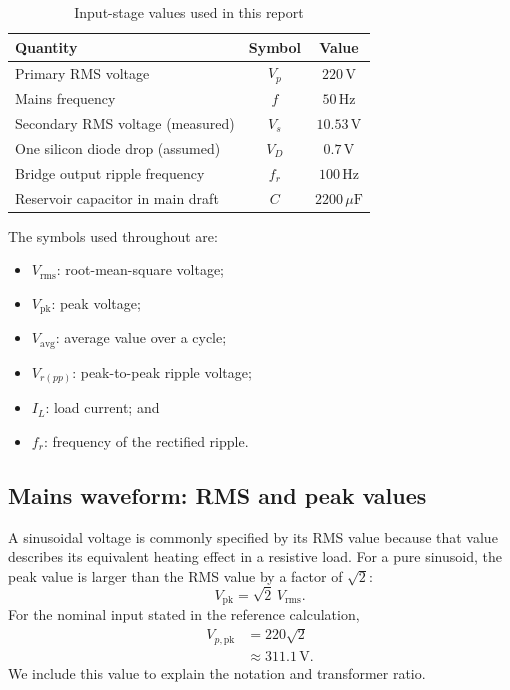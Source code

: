 \documentclass[journal,12pt,twocolumn]{IEEEtran}
\begin{document}
\begin{table}[!t]
\centering
\caption{Input-stage values used in this report}
\label{tab:input-values}
\small
\begin{tabular}{|p{}|c|c|}
\hline
\textbf{Quantity} & \textbf{Symbol} & \textbf{Value}\\ \hline
Primary RMS voltage & $V_p$ & $220\,\mathrm{V}$\\ \hline
Mains frequency & $f$ & $50\,\mathrm{Hz}$\\ \hline
Secondary RMS voltage (measured) & $V_s$ & $10.53\,\mathrm{V}$\\ \hline
One silicon diode drop (assumed) & $V_D$ & $0.7\,\mathrm{V}$\\ \hline
Bridge output ripple frequency & $f_r$ & $100\,\mathrm{Hz}$\\ \hline
Reservoir capacitor in main draft & $C$ & $2200\,\mu\mathrm{F}$\\ \hline
\end{tabular}
\end{table}

The symbols used throughout are:
\begin{itemize}[leftmargin=1.5em]
    \item $V_{\mathrm{rms}}$: root-mean-square voltage;
    \item $V_{\mathrm{pk}}$: peak voltage;
    \item $V_{\mathrm{avg}}$: average value over a cycle;
    \item $V_{r(pp)}$: peak-to-peak ripple voltage;
    \item $I_L$: load current; and
    \item $f_r$: frequency of the rectified ripple.
\end{itemize}

\subsection*{Mains waveform: RMS and peak values}
A sinusoidal voltage is commonly specified by its RMS value because
that value describes its equivalent heating effect in a resistive
load. For a pure sinusoid, the peak value is larger than the RMS value
by a factor of $\sqrt{2}$:
\begin{equation}
    \boxed{V_{\mathrm{pk}}=\sqrt{2}\,V_{\mathrm{rms}}.}
    \label{eq:rms-peak}
\end{equation}
For the nominal input stated in the reference calculation,
\begin{align}
    V_{p,\mathrm{pk}}
    &=220\sqrt{2}\\
    &\approx 311.1\,\mathrm{V}.
\end{align}
We include this value to explain the notation and transformer ratio.
\end{document}

